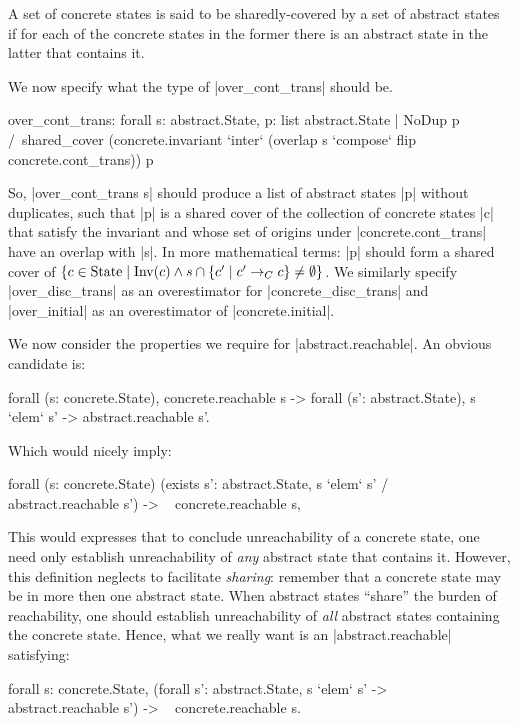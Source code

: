 \documentclass[runningheads]{llncs}
\newcommand{\weg}[1]{}
\newcommand{\State}{{\rm State}}
\newcommand{\Inv}{{\rm Inv}}
\newcommand{\contrans}{\rightarrow_C}
\begin{document}
A set of concrete states is said to be sharedly-covered
by a set of abstract states if for each of the concrete
states in the former there is an abstract state in the latter that
contains it.


We now specify what the type of |over_cont_trans| should be.
\begin{code}
over_cont_trans: forall s: abstract.State,
  { p: list abstract.State | NoDup p /\ shared_cover
    (concrete.invariant `inter` (overlap s `compose` flip concrete.cont_trans)) p }
\end{code}
So, |over_cont_trans s| should produce a list of abstract states |p|
without duplicates,
such that |p| is a shared cover of the collection
of concrete states |c| that satisfy the invariant and whose set of
origins under |concrete.cont_trans| have an overlap with |s|. In more
mathematical terms: |p| should form a shared cover of $\{ c \in \State
\mid \Inv(c) \wedge s\cap \{c' \mid c' \contrans c\} \neq \emptyset\}$.
We similarly specify |over_disc_trans| as an overestimator for
|concrete_disc_trans| and |over_initial| as an overestimator of
|concrete.initial|. 

We now consider the properties we require for |abstract.reachable|. An obvious candidate is:
\begin{code}
  forall (s: concrete.State), concrete.reachable s ->
    forall (s': abstract.State), s `elem` s' -> abstract.reachable s'.
\end{code}
Which would nicely imply:
\begin{code}
forall (s: concrete.State)
  (exists s': abstract.State, s `elem` s' /\ ~ abstract.reachable s') ->
    ~ concrete.reachable s,
\end{code}
This would expresses that to conclude unreachability of a concrete state,
one need only establish unreachability of \emph{any} abstract state
that contains it. However, this definition neglects to facilitate {\em
  sharing}: remember that a concrete state may be in more then one
abstract state. When abstract states ``share'' the burden of
reachability, one should establish unreachability of \emph{all}
abstract states containing the concrete state. Hence, what we really
want is an |abstract.reachable| satisfying:
\begin{code}
forall s: concrete.State,
  (forall s': abstract.State, s `elem` s' -> ~ abstract.reachable s') ->
  ~ concrete.reachable s.
\end{code}
\weg{
This property follows from the following new definition of |reachable_respect| we will use:
\begin{code}
Definition reachable_respect: Prop :=
  shared_cover concrete.reachable abstract.reachable.
\end{code}
}
\end{document}
